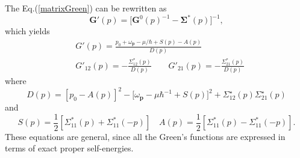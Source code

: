 \documentclass[12pt]{article}
\begin{document}
The Eq.(\ref{matrixGreen}) can be rewritten as 
\begin{equation}
    \mathbf{G}'(p)=\big[\mathbf{G}^0(p)^{-1}-\boldsymbol{\Sigma}^*(p)\big]^{-1},
\end{equation}  
which yields 
\begin{equation}\label{eGp}
    \begin{split}
        &G'(p)=\frac{p_0+\omega_{\mathbf{p}}-\mu/\hbar+S(p)-A(p)}{D(p)}\\
        &G'_{12}(p)=-\frac{\Sigma^*_{12}(p)}{D(p)}\qquad
        G'_{21}(p)=-\frac{\Sigma^*_{21}(p)}{D(p)}
    \end{split}
\end{equation}
where
\begin{equation}
    D(p)=\left[p_{0}-A(p)\right]^{2}-\big[\omega_{\mathbf{p}}-\mu\hbar^{-1}+S(p)
    \big]^{2}+\Sigma_{12}^{\star}(p) \Sigma_{21}^{\star}(p)
\end{equation}
and 
\begin{equation}
    S(p)=\frac{1}{2}\left[\Sigma_{11}^*(p)+\Sigma_{11}^*(-p)\right]\quad 
    A(p)=\frac{1}{2}\left[\Sigma_{11}^*(p)-\Sigma_{11}^*(-p)\right].
\end{equation}
These equations are general, since all the Green's functions are expressed in terms 
of exact proper self-energies.
\end{document}
